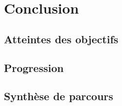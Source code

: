 \documentclass[12pt,a4paper]{report}
\begin{document}
\newpage
\section{Conclusion}
\subsection{Atteintes des objectifs}
\subsection{Progression}
\subsection{Synthèse de parcours}


\newpage
\begin{appendix}

\end{appendix}
\end{document}
